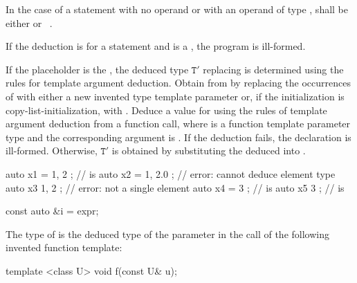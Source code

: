 In the case of a  statement with no operand
or with an operand of type ,
 shall be either
 or \cv{}~.

\pnum
If the deduction is for a  statement
and  is a ,
the program is ill-formed.

\pnum
If the placeholder is the  , the
deduced type
$\mathtt{T}'$ replacing 
is determined using the rules for template argument deduction.
Obtain  from
 by replacing the occurrences of  with either a new
invented type template parameter  or,
if the initialization is copy-list-initialization, with
. Deduce a value for  using the rules
of template argument deduction from a function call,
where  is a
function template parameter type and
the corresponding argument is .
If the deduction fails, the declaration is ill-formed.
Otherwise, $\mathtt{T}'$ is obtained by
substituting the deduced  into .
\begin{example}
\begin{codeblock}
auto x1 = { 1, 2 };             //  is 
auto x2 = { 1, 2.0 };           // error: cannot deduce element type
auto x3{ 1, 2 };                // error: not a single element
auto x4 = { 3 };                //  is 
auto x5{ 3 };                   //  is 
\end{codeblock}
\end{example}

\begin{example}
\begin{codeblock}
const auto &i = expr;
\end{codeblock}
The type of  is the deduced type of the parameter  in
the call  of the following invented function template:
\begin{codeblock}
template <class U> void f(const U& u);
\end{codeblock}
\end{example}

